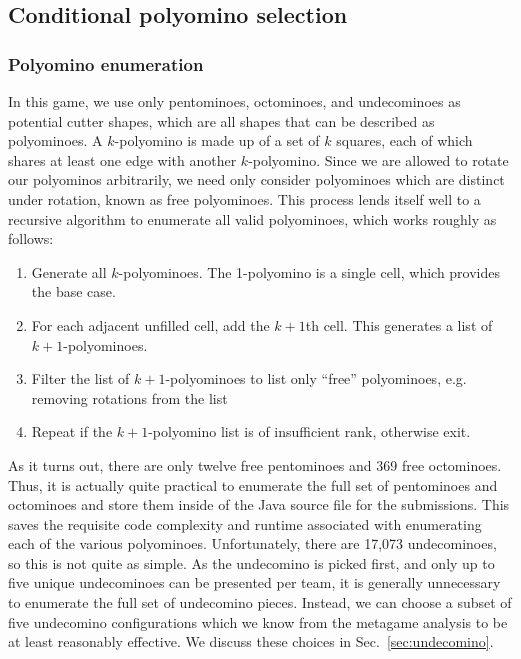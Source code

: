 \documentclass{scrartcl}
\begin{document}

\subsection{Conditional polyomino selection}\label{sec:selection}

\subsubsection{Polyomino enumeration}
In this game, we use only pentominoes, octominoes, and undecominoes as potential cutter shapes, which are all shapes that can be described as polyominoes. A $k$-polyomino is made up of a set of $k$ squares, each of which shares at least one edge with another $k$-polyomino. Since we are allowed to rotate our polyominos arbitrarily, we need only consider polyominoes which are distinct under rotation, known as free polyominoes. This process lends itself well to a recursive algorithm to enumerate all valid polyominoes, which works roughly as follows:
\begin{enumerate}
\item Generate all $k$-polyominoes. The 1-polyomino is a single cell, which provides the base case.
\item For each adjacent unfilled cell, add the $k+1$th cell. This generates a list of $k+1$-polyominoes.
\item Filter the list of $k+1$-polyominoes to list only ``free'' polyominoes, e.g. removing rotations from the list
\item Repeat if the $k+1$-polyomino list is of insufficient rank, otherwise exit.
\end{enumerate}
As it turns out, there are only twelve free pentominoes and 369 free octominoes. Thus, it is actually quite practical to enumerate the full set of pentominoes and octominoes and store them inside of the Java source file for the submissions. This saves the requisite code complexity and runtime associated with enumerating each of the various polyominoes. Unfortunately, there are 17,073 undecominoes, so this is not quite as simple. As the undecomino is picked first, and only up to five unique undecominoes can be presented per team, it is generally unnecessary to enumerate the full set of undecomino pieces. Instead, we can choose a subset of five undecomino configurations which we know from the metagame analysis to be at least reasonably effective. We discuss these choices in Sec.~\ref{sec:undecomino}.
\end{document}
